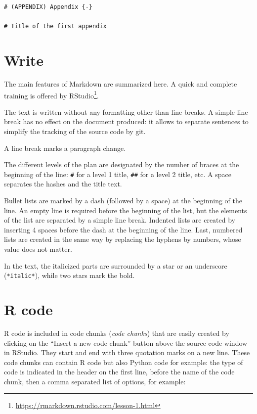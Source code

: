 \documentclass[
  12pt,
  american,
  a4paper,
  extrafontsizes,onecolumn,openright
  ]{memoir}
\begin{document}
\begin{verbatim}
# (APPENDIX) Appendix {-} 

# Title of the first appendix
\end{verbatim}

\hypertarget{write}{%
\section{Write}\label{write}}

The main features of Markdown are summarized here.
A quick and complete training is offered by RStudio\footnote{\url{https://rmarkdown.rstudio.com/lesson-1.html}}.

The text is written without any formatting other than line breaks.
A simple line break has no effect on the document produced: it allows to separate sentences to simplify the tracking of the source code by git.

A line break marks a paragraph change.

The different levels of the plan are designated by the number of braces at the beginning of the line: \texttt{\#} for a level 1 title, \texttt{\#\#} for a level 2 title, etc.
A space separates the hashes and the title text.

Bullet lists are marked by a dash (followed by a space) at the beginning of the line.
An empty line is required before the beginning of the list, but the elements of the list are separated by a simple line break.
Indented lists are created by inserting 4 spaces before the dash at the beginning of the line.
Last, numbered lists are created in the same way by replacing the hyphens by numbers, whose value does not matter.

In the text, the italicized parts are surrounded by a star or an underscore (\texttt{*italic*}), while two stars mark the bold.

\hypertarget{r-code}{%
\section{R code}\label{r-code}}

R code is included in code chunks (\emph{code chunks}) that are easily created by clicking on the \enquote{Insert a new code chunk} button above the source code window in RStudio.
They start and end with three quotation marks on a new line.
These code chunks can contain R code but also Python code for example: the type of code is indicated in the header on the first line, before the name of the code chunk, then a comma separated list of options, for example:
\end{document}
